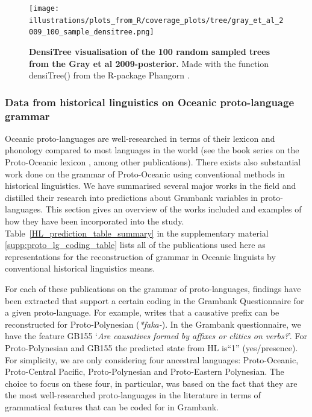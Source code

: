 \documentclass[12pt,letterpaper]{article}
\begin{document}
\begin{figure}[ht]
\centering
\texttt{[image: illustrations/plots\_from\_R/coverage\_plots/tree/gray\_et\_al\_2009\_100\_sample\_densitree.png]}
\caption{\textbf{DensiTree \citep{bouckaert2014densitree} visualisation of the 100 random sampled trees from the Gray et al 2009-posterior.} Made with the function densiTree() from the R-package Phangorn \citep{phangorn}.}
\label{densitree_plot}
\end{figure}


\FloatBarrier
\subsubsection{Data from historical linguistics on Oceanic proto-language grammar}
\label{sec:POC_lit_review}


Oceanic proto-languages are well-researched in terms of their lexicon and phonology compared to most languages in the world (see the book series on the Proto-Oceanic lexicon \citep{protooceanicvol1, protooceanicvol2, protooceanicvol3, protooceanicvol4, protooceanicvol5}, among other publications). There exists also substantial work done on the grammar of Proto-Oceanic using conventional methods in historical linguistics. We have summarised several major works in the field and distilled their research into predictions about Grambank variables in proto-languages. This section gives an overview of the works included and examples of how they have been incorporated into the study. Table~\ref{HL_prediction_table_summary} in the supplementary material \ref{supp:proto_lg_coding_table} lists all of the publications used here as representations for the reconstruction of grammar in Oceanic linguists by conventional historical linguistics means.

For each of these publications on the grammar of proto-languages, findings have been extracted that support a certain coding in the Grambank Questionnaire for a given proto-language. For example, \citet[4]{marck2000_encyclo} writes that a causative prefix can be reconstructed for Proto-Polynesian (\emph{*faka-}). In the Grambank questionnaire, we have the feature GB155 `\emph{Are causatives formed by affixes or clitics on verbs?}'. For Proto-Polynesian and GB155 the predicted state from HL is``1'' (yes/presence). For simplicity, we are only considering four ancestral languages: Proto-Oceanic, Proto-Central Pacific, Proto-Polynesian and Proto-Eastern Polynesian. The choice to focus on these four, in particular, was based on the fact that they are the most well-researched proto-languages in the literature in terms of grammatical features that can be coded for in Grambank. 
\end{document}
